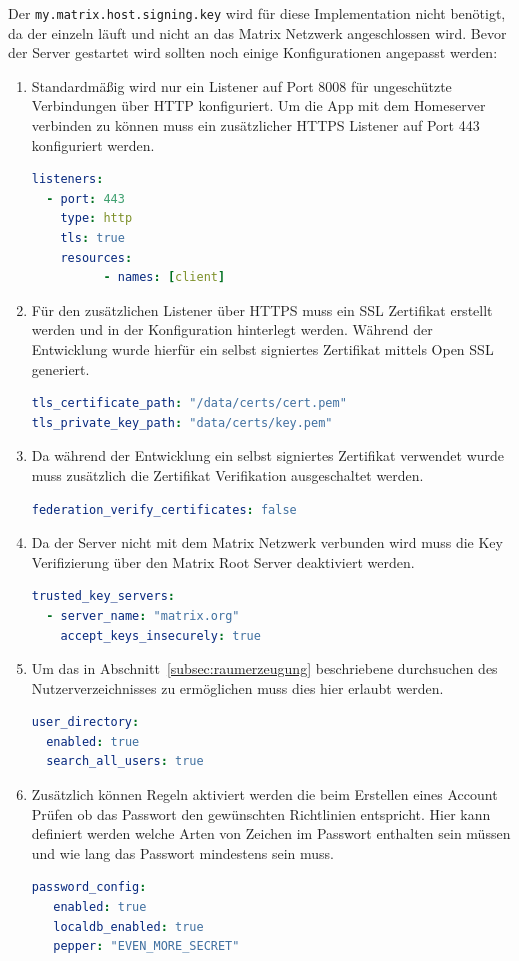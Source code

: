     Der \texttt{my.matrix.host.signing.key} wird für diese Implementation nicht benötigt, da der einzeln läuft und nicht an das Matrix Netzwerk angeschlossen wird.
    Bevor der Server gestartet wird sollten noch einige Konfigurationen angepasst werden:
    \begin{enumerate}[label={(\arabic*)}]
        \item Standardmäßig wird nur ein Listener auf Port 8008 für ungeschützte Verbindungen über HTTP konfiguriert.
                Um die App mit dem Homeserver verbinden zu können muss ein zusätzlicher HTTPS Listener auf Port 443 konfiguriert werden.
            \begin{lstlisting}[language=yaml,label={lst:listener}]
listeners:
  - port: 443
    type: http
    tls: true
    resources:
          - names: [client]
            \end{lstlisting}
        \item Für den zusätzlichen Listener über HTTPS muss ein SSL Zertifikat erstellt werden und in der Konfiguration hinterlegt werden. Während der Entwicklung wurde hierfür ein selbst signiertes Zertifikat mittels Open SSL generiert.
            \begin{lstlisting}[language=yaml,label={lst:ssl-certificate}]
tls_certificate_path: "/data/certs/cert.pem"
tls_private_key_path: "data/certs/key.pem"
            \end{lstlisting}
        \item Da während der Entwicklung ein selbst signiertes Zertifikat verwendet wurde muss zusätzlich die Zertifikat Verifikation ausgeschaltet werden.
            \begin{lstlisting}[language=yaml,label={lst:disable-cert}]
federation_verify_certificates: false
            \end{lstlisting}
        \item Da der Server nicht mit dem Matrix Netzwerk verbunden wird muss die Key Verifizierung über den Matrix Root Server deaktiviert werden.
            \begin{lstlisting}[language=yaml,label={lst:disable-key-verification}]
trusted_key_servers:
  - server_name: "matrix.org"
    accept_keys_insecurely: true
            \end{lstlisting}
        \item Um das in Abschnitt~\ref{subsec:raumerzeugung} beschriebene durchsuchen des Nutzerverzeichnisses zu ermöglichen muss dies hier erlaubt werden.
            \begin{lstlisting}[language=yaml,label={lst:user-directory}]
user_directory:
  enabled: true
  search_all_users: true
            \end{lstlisting}
        \item Zusätzlich können Regeln aktiviert werden die beim Erstellen eines Account Prüfen ob das Passwort den gewünschten Richtlinien entspricht.
                Hier kann definiert werden welche Arten von Zeichen im Passwort enthalten sein müssen und wie lang das Passwort mindestens sein muss.
            \begin{lstlisting}[language=yaml,label={lst:password-policy}]
password_config:
   enabled: true
   localdb_enabled: true
   pepper: "EVEN_MORE_SECRET"


\end{lstlisting}
\end{enumerate}
